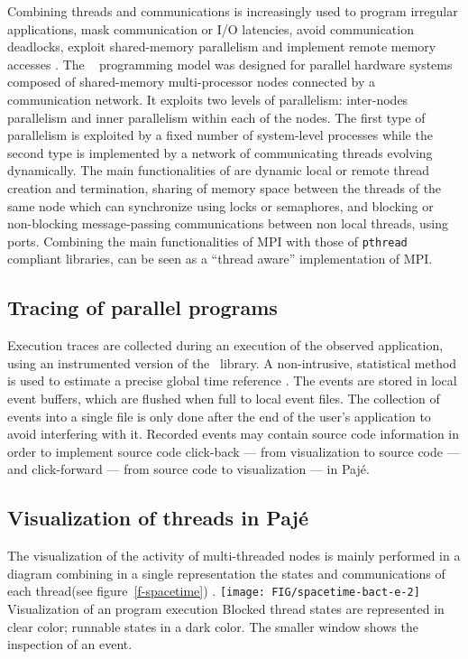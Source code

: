 Combining threads and communications is increasingly used to program
irregular applications, mask communication or I/O latencies, avoid
communication deadlocks, exploit shared-memory parallelism and
implement remote memory accesses
\cite{Fahringer:1995:UTD,FosterKT96,hicss95}.  The
\ath~\cite{ath0b-europar97} programming model was designed for
parallel hardware systems composed of shared-memory multi-processor
nodes connected by a communication network. It exploits two levels of
parallelism: inter-nodes parallelism and inner parallelism within each
of the nodes. The first type of parallelism is exploited by a fixed
number of system-level processes while the second type is implemented
by a network of communicating threads evolving dynamically. The main
functionalities of \ath are dynamic local or remote thread creation
and termination, sharing of memory space between the threads of the
same node which can synchronize using locks or semaphores, and
blocking or non-blocking message-passing communications between non
local threads, using ports. Combining the main functionalities of MPI
\cite{MPI} with those of \texttt{pthread} compliant libraries, \ath
can be seen as a ``thread aware'' implementation of MPI.

\subsection{Tracing of parallel programs}
\label{sec:tracing}

Execution traces are collected during an execution of the observed
application, using an instrumented version of the \ath\ library. A
non-intrusive, statistical method is used to estimate a precise global
time reference \cite{MailletT:1995}. The events are stored in local
event buffers, which are flushed when full to local event files.  The
collection of events into a single file is only done after the end of
the user's application to avoid interfering with it.  Recorded events
may contain source code information in order to implement source code
click-back --- from visualization to source code --- and click-forward
--- from source code to visualization --- in Pajé.

\subsection{Visualization of threads in Pajé}
\label{s-spacetime}

The visualization of the activity of multi-threaded nodes is mainly
performed in a diagram combining in a single representation the states
and communications of each thread(see figure~\ref{f-spacetime}) .
%
 {\texttt{[image: FIG/spacetime-bact-e-2]}}
{Visualization of an \ath program execution} {Blocked thread states
  are represented in clear color; runnable states in a dark color. The
  smaller window shows the inspection of an event.}

